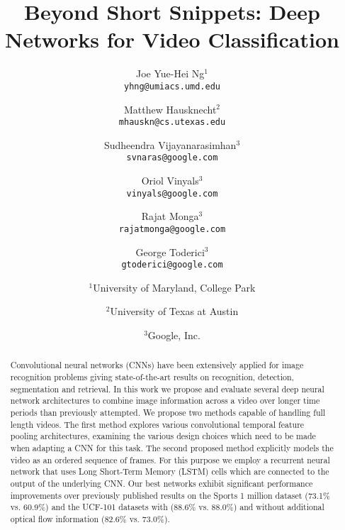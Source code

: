 \documentclass[10pt,twocolumn,letterpaper]{article}
\begin{document}
\title{Beyond Short Snippets: Deep Networks for Video Classification}

\author{Joe Yue-Hei Ng$^1$\\
{\tt\small yhng@umiacs.umd.edu} \\
\and
Matthew Hausknecht$^2$ \\
{\tt\small mhauskn@cs.utexas.edu} \\
\and
Sudheendra Vijayanarasimhan$^3$ \\
{\tt\small svnaras@google.com} \\
\and
Oriol Vinyals$^3$ \\
{\tt\small vinyals@google.com} \\
\and
Rajat Monga$^3$ \\
{\tt\small rajatmonga@google.com} \\
\and
George Toderici$^3$ \\
{\tt\small gtoderici@google.com} \\
\and
$^1$University of Maryland, College Park\\
\and
$^2$University of Texas at Austin \\
\and
$^3$Google, Inc. \\
}

\maketitle
\begin{abstract}
Convolutional neural networks (CNNs) have been extensively applied for image
recognition problems giving state-of-the-art results on recognition, detection,
segmentation and retrieval.  In this work we propose and evaluate several deep
neural network architectures to combine image information across a video over
longer time periods than previously attempted.  We propose two methods capable of
handling full length videos. The first method explores various convolutional
temporal feature pooling architectures, examining the various design choices
which need to be made when adapting a CNN for this task. The second proposed
method explicitly models the video as an ordered sequence of frames. For this
purpose we employ a recurrent neural network that uses Long Short-Term Memory (LSTM)
cells which are connected to the output of the underlying CNN. Our best
networks exhibit significant performance improvements over previously published
results on the Sports 1 million dataset (73.1\% vs.  60.9\%) and the UCF-101
datasets with (88.6\% vs.  88.0\%) and without additional optical flow
information (82.6\% vs. 73.0\%).

\end{abstract}
\end{document}
